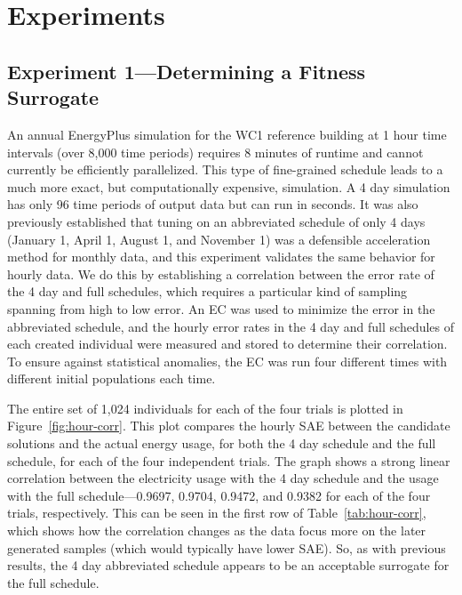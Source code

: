 \documentclass[preprint, review, 12pt]{elsarticle}
\begin{document}
\section{Experiments}
\label{sec:hourly}

\subsection{Experiment 1---Determining a Fitness Surrogate}
\label{sub:experiment1}
An annual EnergyPlus simulation for the WC1 reference building at 1 hour time intervals (over 8,000 time periods) requires 8 minutes of runtime and cannot currently be efficiently parallelized. This type of fine-grained schedule leads to a much more exact, but computationally expensive, simulation. A 4 day simulation has only 96 time periods of output data but can run in seconds. It was also previously established \cite{cit:garrett2013} that tuning on an abbreviated schedule of only 4 days (January 1, April 1, August 1, and November 1) was a defensible acceleration method for monthly data, and this experiment validates the same behavior for hourly data. We do this by establishing a correlation between the error rate of the 4 day and full schedules, which requires a particular kind of sampling spanning from high to low error. An EC was used to minimize the error in the abbreviated schedule, and the hourly error rates in the 4 day and full schedules of each created individual were measured and stored to determine their correlation. To ensure against statistical anomalies, the EC was run four different times with different initial populations each time.

The entire set of 1,024 individuals for each of the four trials is plotted in Figure~\ref{fig:hour-corr}. This plot compares the hourly SAE between the candidate solutions and the actual energy usage, for both the 4 day schedule and the full schedule, for each of the four independent trials. The graph shows a strong linear correlation between the electricity usage with the 4 day schedule and the usage with the full schedule---0.9697, 0.9704, 0.9472, and 0.9382 for each of the four trials, respectively. This can be seen in the first row of Table~\ref{tab:hour-corr}, which shows how the correlation changes as the data focus more on the later generated samples (which would typically have lower SAE). So, as with previous results, the 4 day abbreviated schedule appears to be an acceptable surrogate for the full schedule. 
\end{document}
